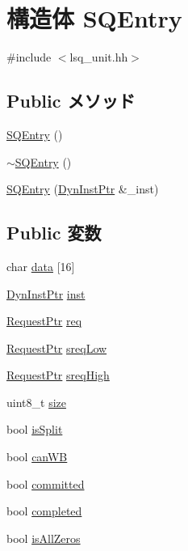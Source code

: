 \hypertarget{structLSQUnit_1_1SQEntry}{
\section{構造体 SQEntry}
\label{structLSQUnit_1_1SQEntry}
}


{\ttfamily \#include $<$lsq\_\-unit.hh$>$}\subsection*{Public メソッド}
\begin{DoxyCompactItemize}
\item 
\hyperlink{structLSQUnit_1_1SQEntry_a3e45ad78b5babe810aa50349be32637b}{SQEntry} ()
\item 
\hyperlink{structLSQUnit_1_1SQEntry_af0d1628e74b0c1240075eaee424f80f8}{$\sim$SQEntry} ()
\item 
\hyperlink{structLSQUnit_1_1SQEntry_a3b163ba1f4e957334b0fe8a659562015}{SQEntry} (\hyperlink{classLSQUnit_a028ce10889c5f6450239d9e9a7347976}{DynInstPtr} \&\_\-inst)
\end{DoxyCompactItemize}
\subsection*{Public 変数}
\begin{DoxyCompactItemize}
\item 
char \hyperlink{structLSQUnit_1_1SQEntry_a4454a49c48ef08781793358f56b7bbc6}{data} \mbox{[}16\mbox{]}
\item 
\hyperlink{classLSQUnit_a028ce10889c5f6450239d9e9a7347976}{DynInstPtr} \hyperlink{structLSQUnit_1_1SQEntry_af5d4fb974eeb4507d4c837d365d0cefc}{inst}
\item 
\hyperlink{classRequest}{RequestPtr} \hyperlink{structLSQUnit_1_1SQEntry_a956cd41d82347558b9c0a5b0474903f2}{req}
\item 
\hyperlink{classRequest}{RequestPtr} \hyperlink{structLSQUnit_1_1SQEntry_a8c06ecd03202f5de1fc60cf6194ff285}{sreqLow}
\item 
\hyperlink{classRequest}{RequestPtr} \hyperlink{structLSQUnit_1_1SQEntry_a1464e1dd7de6d5752d05938f0b3bc171}{sreqHigh}
\item 
uint8\_\-t \hyperlink{structLSQUnit_1_1SQEntry_ae5dc6ffcd9b7605c7787791e40cc6bb0}{size}
\item 
bool \hyperlink{structLSQUnit_1_1SQEntry_afd8e5886f3bd5827ade12fcaf8ea2a47}{isSplit}
\item 
bool \hyperlink{structLSQUnit_1_1SQEntry_a2e445065a38a8a82256decf088cd3e6d}{canWB}
\item 
bool \hyperlink{structLSQUnit_1_1SQEntry_a28712f511a3687635fff96e084fdab9a}{committed}
\item 
bool \hyperlink{structLSQUnit_1_1SQEntry_a8c06e370b709d689e392a4b7b53b47c5}{completed}
\item 
bool \hyperlink{structLSQUnit_1_1SQEntry_a10014e17609d3ee0e6018bcbba1f4e88}{isAllZeros}
\end{DoxyCompactItemize}
